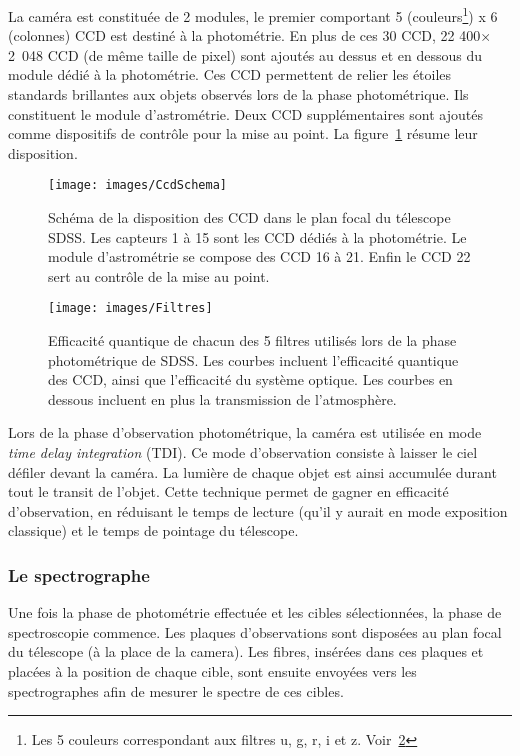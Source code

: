 \documentclass[11pt, twoside, a4paper, openright]{report}
\begin{document}
La caméra est constituée de 2 modules, le premier comportant 5 (couleurs\footnote{Les 5 couleurs correspondant aux filtres u, g, r, i et z. Voir~\ref{fig:Filtres}}) x 6 (colonnes) CCD est destiné à la photométrie. En plus de ces 30 CCD, 22 400$\times$2~048 CCD (de même taille de pixel) sont ajoutés au dessus et en dessous du module dédié à la photométrie. Ces CCD permettent de relier les étoiles standards brillantes aux objets observés lors de la phase photométrique. Ils constituent le module d'astrométrie. Deux CCD supplémentaires sont ajoutés comme dispositifs de contrôle pour la mise au point. La figure~\ref{fig:CcdSchema} résume leur disposition.
\begin{figure}
  \centering
  \texttt{[image: images/CcdSchema]}
  \caption{Schéma de la disposition des CCD dans le plan focal du télescope SDSS. Les capteurs 1 à 15 sont les CCD dédiés à la photométrie. Le module d'astrométrie se compose des CCD 16 à 21. Enfin le CCD 22 sert au contrôle de la mise au point.}
  \label{fig:CcdSchema}
\end{figure}

\begin{figure}
  \centering
  \texttt{[image: images/Filtres]}
  \caption{Efficacité quantique de chacun des 5 filtres utilisés lors de la phase photométrique de SDSS. Les courbes incluent l'efficacité quantique des CCD, ainsi que l'efficacité du système optique. Les courbes en dessous incluent en plus la transmission de l'atmosphère.}
  \label{fig:Filtres}
\end{figure}

Lors de la phase d'observation photométrique, la caméra est utilisée en mode \emph{time delay integration} (TDI). Ce mode d'observation consiste à laisser le ciel défiler devant la caméra. La lumière de chaque objet est ainsi accumulée durant tout le transit de l'objet. Cette technique permet de gagner en efficacité d'observation, en réduisant le temps de lecture (qu'il y aurait en mode exposition classique) et le temps de pointage du télescope.


\subsubsection{Le spectrographe}
Une fois la phase de photométrie effectuée et les cibles sélectionnées, la phase de spectroscopie commence. Les plaques d'observations sont disposées au plan focal du télescope (à la place de la camera). Les fibres, insérées dans ces plaques et placées à la position de chaque cible, sont ensuite envoyées vers les spectrographes \cite{Smee2012} afin de mesurer le spectre de ces cibles.
\end{document}
